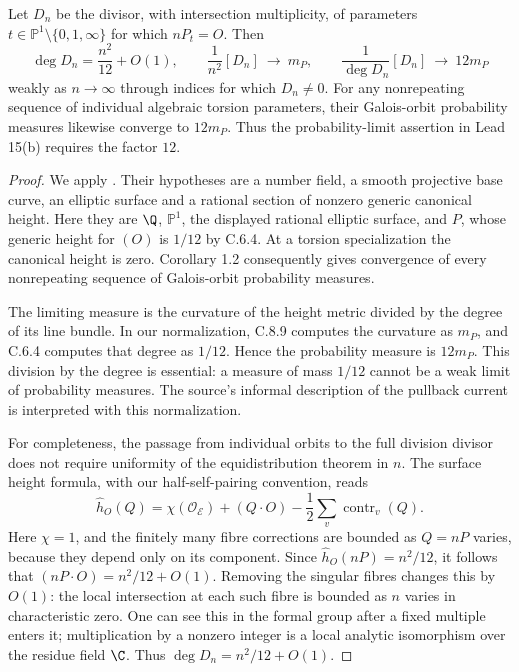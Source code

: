 \begin{proposition}\label{ari:C.8.10}
Let $D_n$ be the divisor, with intersection multiplicity, of
parameters $t\in\mathbb P^1\setminus\{0,1,\infty\}$ for which
$nP_t=O$. Then
\[
 \deg D_n=\frac{n^2}{12}+O(1),\qquad
 \frac1{n^2}[D_n]\ \longrightarrow\ m_P,\qquad
 \frac1{\deg D_n}[D_n]\ \longrightarrow\ 12m_P
\]
weakly as $n\to\infty$ through indices for which $D_n\ne0$.
For any nonrepeating sequence of individual algebraic torsion
parameters, their Galois-orbit probability measures likewise
converge to $12m_P$. Thus the probability-limit assertion
in Lead 15(b) requires the factor $12$.
\end{proposition}
\begin{proof}
We apply \citet[Theorem 1.1 and Corollary 1.2]{demarco2017}.
Their hypotheses are a number field, a smooth projective
base curve, an elliptic surface and a rational section of
nonzero generic canonical height. Here they are $\Q$,
$\mathbb P^1$, the displayed rational elliptic surface,
and $P$, whose generic height for $(O)$ is $1/12$ by C.6.4.
At a torsion specialization the canonical height is zero.
Corollary 1.2 consequently gives convergence of every
nonrepeating sequence of Galois-orbit probability measures.

The limiting measure is the curvature of the height metric
divided by the degree of its line bundle. In our normalization,
C.8.9 computes the curvature as $m_P$, and C.6.4 computes
that degree as $1/12$. Hence the probability measure is
$12m_P$. This division by the degree is essential: a measure
of mass $1/12$ cannot be a weak limit of probability measures.
The source's informal description of the pullback current
is interpreted with this normalization.

For completeness, the passage from individual orbits to
the full division divisor does not require uniformity of
the equidistribution theorem in $n$. The surface height
formula, with our half-self-pairing convention, reads
\[
 \widehat h_O(Q)=\chi(\mathcal O_{\mathcal E})+(Q\cdot O)
                -\frac12\sum_v\operatorname{contr}_v(Q).
\]
Here $\chi=1$, and the finitely many fibre corrections are
bounded as $Q=nP$ varies, because they depend only on its
component. Since $\widehat h_O(nP)=n^2/12$, it follows
that $(nP\cdot O)=n^2/12+O(1)$. Removing the singular fibres
changes this by $O(1)$: the local intersection at each
such fibre is bounded as $n$ varies in characteristic zero.
One can see this in the formal group after a fixed
multiple enters it; multiplication by a nonzero integer
is a local analytic isomorphism over the residue field
$\C$. Thus $\deg D_n=n^2/12+O(1)$.


\end{proof}
